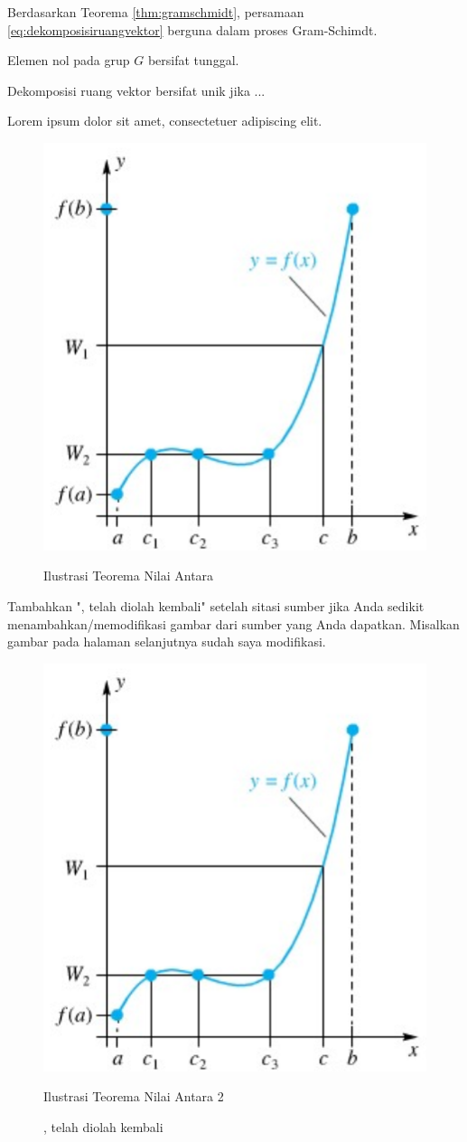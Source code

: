 Berdasarkan Teorema \ref{thm:gramschmidt}, persamaan \eqref{eq:dekomposisiruangvektor} berguna dalam proses Gram-Schimdt.

\begin{lemma}
    Elemen nol pada grup $G$ bersifat tunggal.
\end{lemma}

\begin{corollary}
    Dekomposisi ruang vektor bersifat unik jika ...
\end{corollary}

\begin{remark}
    Lorem ipsum dolor sit amet, consectetuer adipiscing elit.
\end{remark}

\begin{figure}[H]
    \centering
    \includegraphics[width=0.5\linewidth]{gambar/teo_nilai_antara.png}
    \caption{Ilustrasi Teorema Nilai Antara}
    \caption*{\small \citep{varberg2007calculus}} %
    \label{fig:teonilaiantara}
\end{figure}

Tambahkan ", telah diolah kembali" setelah sitasi sumber jika Anda sedikit menambahkan/memodifikasi gambar dari sumber yang Anda dapatkan. Misalkan gambar pada halaman selanjutnya sudah saya modifikasi.
\begin{figure}[H]
    \centering
    \includegraphics[width=0.5\linewidth]{gambar/teo_nilai_antara.png}
    \caption{Ilustrasi Teorema Nilai Antara 2}
    \caption*{\small \citep{varberg2007calculus}, telah diolah kembali} %
    \label{fig:teonilaiantara2}
\end{figure}

